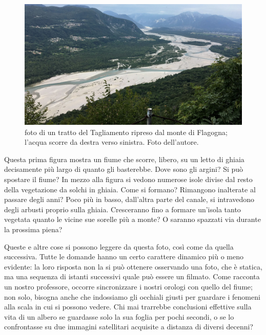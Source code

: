 

\begin{figure}[h]
	\centering
	\includegraphics[width=\textwidth]{files/foto_flagogna.jpg}
	\caption[foto di un tratto del Tagliamento ripreso dal monte di Flagogna]{foto di un tratto del Tagliamento ripreso dal monte di Flagogna; l'acqua scorre da destra verso sinistra. Foto dell'autore.
	}
	\label{fig:foto-flagogna}
\end{figure}



Questa prima figura mostra un fiume che scorre, libero, su un letto di ghiaia decisamente più largo di quanto gli basterebbe. 
Dove sono gli argini? Si può spostare il fiume? 
%
In mezzo alla figura si vedono numerose isole divise dal resto della vegetazione da solchi in ghiaia. 
Come si formano? Rimangono inalterate al passare degli anni? 
%
Poco più in basso, dall'altra parte del canale, si intravedono degli arbusti proprio sulla ghiaia. 
Cresceranno fino a formare un'isola tanto vegetata quanto le vicine sue sorelle più a monte? O saranno spazzati via durante la prossima piena?

\medskip
Queste e altre cose si possono leggere da questa foto, così come da quella successiva. Tutte le domande hanno un certo carattere dinamico più o meno evidente: la loro risposta non la si può ottenere osservando una foto, che è statica, ma una sequenza di istanti successivi quale può essere un filmato.
Come racconta un nostro professore, occorre sincronizzare i nostri orologi con quello del fiume; non solo, bisogna anche che indossiamo gli occhiali giusti per guardare i fenomeni alla scala in cui si possono vedere. Chi mai trarrebbe conclusioni effettive sulla vita di un albero se guardasse solo la sua foglia per pochi secondi, o se lo confrontasse su due immagini satellitari acquisite a distanza di diversi decenni?


